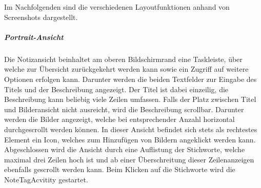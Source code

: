 Im Nachfolgenden sind die verschiedenen Layoutfunktionen anhand von Screenshots dargestellt.

\subparagraph{Portrait-Ansicht}
Die Notizansicht beinhaltet am oberen Bildschirmrand eine Taskleiste, über welche zur Übersicht zurückgekehrt werden kann sowie ein Zugriff auf weitere Optionen erfolgen kann. Darunter werden die beiden Textfelder zur Eingabe des Titels und der Beschreibung angezeigt. Der Titel ist dabei einzeilig, die Beschreibung kann beliebig viele Zeilen umfassen. Falls der Platz zwischen Titel und Bilderansicht nicht ausreicht, wird die Beschreibung scrollbar. Darunter werden die Bilder angezeigt, welche bei entsprechender Anzahl horizontal durchgescrollt werden können. In dieser Ansicht befindet sich stets als rechtestes Element ein Icon, welches zum Hinzufügen von Bildern angeklickt werden kann. Abgeschlossen wird die Ansicht durch eine Auflistung der Stichworte, welche maximal drei Zeilen hoch ist und ab einer Überschreitung dieser Zeilenanzeigen ebenfalls gescrollt werden kann. Beim Klicken auf die Stichworte wird die NoteTagAcvitity gestartet.

